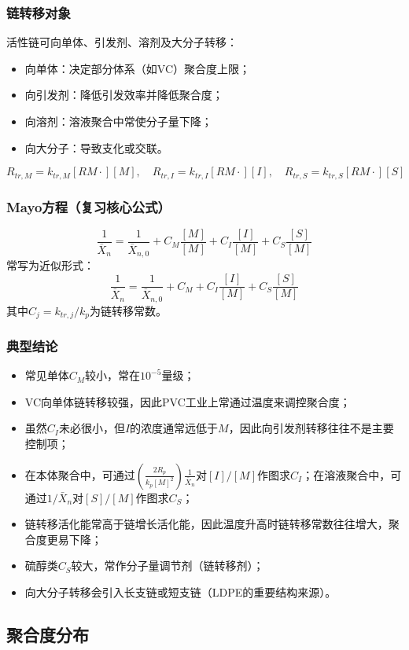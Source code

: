﻿\documentclass[12pt,a4paper]{article}
\begin{document}
\subsubsection{链转移对象}
活性链可向单体、引发剂、溶剂及大分子转移：
\begin{itemize}
  \item 向单体：决定部分体系（如VC）聚合度上限；
  \item 向引发剂：降低引发效率并降低聚合度；
  \item 向溶剂：溶液聚合中常使分子量下降；
  \item 向大分子：导致支化或交联。
\end{itemize}
\[
R_{tr,M}=k_{tr,M}[RM\cdot][M],\quad
R_{tr,I}=k_{tr,I}[RM\cdot][I],\quad
R_{tr,S}=k_{tr,S}[RM\cdot][S]
\]

\subsubsection{Mayo方程（复习核心公式）}
\[
\frac{1}{\bar{X}_n}=\frac{1}{\bar{X}_{n,0}}+C_M\frac{[M]}{[M]}+C_I\frac{[I]}{[M]}+C_S\frac{[S]}{[M]}
\]
常写为近似形式：
\[
\frac{1}{\bar{X}_n}=\frac{1}{\bar{X}_{n,0}}+C_M+C_I\frac{[I]}{[M]}+C_S\frac{[S]}{[M]}
\]
其中$C_j=k_{tr,j}/k_p$为链转移常数。

\subsubsection{典型结论}
\begin{itemize}
  \item 常见单体$C_M$较小，常在$10^{-5}$量级；
  \item VC向单体链转移较强，因此PVC工业上常通过温度来调控聚合度；
  \item 虽然$C_I$未必很小，但$I$的浓度通常远低于$M$，因此向引发剂转移往往不是主要控制项；
  \item 在本体聚合中，可通过$\left(\frac{2R_p}{k_p[M]^2}\right)\frac{1}{\bar{X}_n}$对$[I]/[M]$作图求$C_I$；在溶液聚合中，可通过$1/\bar{X}_n$对$[S]/[M]$作图求$C_S$；
  \item 链转移活化能常高于链增长活化能，因此温度升高时链转移常数往往增大，聚合度更易下降；
  \item 硫醇类$C_S$较大，常作分子量调节剂（链转移剂）；
  \item 向大分子转移会引入长支链或短支链（LDPE的重要结构来源）。
\end{itemize}

\subsection{聚合度分布}
\end{document}
